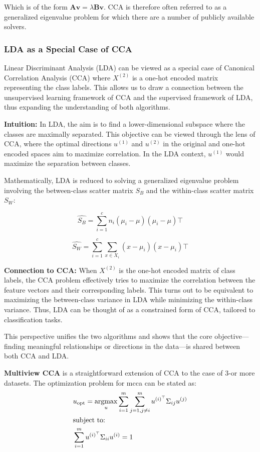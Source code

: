Which is of the form $\mathbf{A v} = \lambda \mathbf{B v}$. CCA is therefore often referred to as a generalized eigenvalue problem for which there are a number of publicly available solvers.

\subsubsection{LDA as a Special Case of CCA}

Linear Discriminant Analysis (LDA) can be viewed as a special case of Canonical Correlation Analysis (CCA) where \(X^{(2)}\) is a one-hot encoded matrix representing the class labels.
This allows us to draw a connection between the unsupervised learning framework of CCA and the supervised framework of LDA, thus expanding the understanding of both algorithms.

\textbf{Intuition:} In LDA, the aim is to find a lower-dimensional subspace where the classes are maximally separated. This objective can be viewed through the lens of CCA, where the optimal directions \(u^{(1)}\) and \(u^{(2)}\) in the original and one-hot encoded spaces aim to maximize correlation. In the LDA context, \(u^{(1)}\) would maximize the separation between classes.

Mathematically, LDA is reduced to solving a generalized eigenvalue problem involving the between-class scatter matrix \(S_B\) and the within-class scatter matrix \(S_W\):

\[
    \hat{S_B} = \sum_{i=1}^{c} n_i (\mu_i - \mu)(\mu_i - \mu)\top
\]

\[
    \hat{S_W} = \sum_{i=1}^{c} \sum_{x \in X_i} (x - \mu_i)(x - \mu_i)\top
\]

\textbf{Connection to CCA:} When \(X^{(2)}\) is the one-hot encoded matrix of class labels, the CCA problem effectively tries to maximize the correlation between the feature vectors and their corresponding labels.
This turns out to be equivalent to maximizing the between-class variance in LDA while minimizing the within-class variance.
Thus, LDA can be thought of as a constrained form of CCA, tailored to classification tasks.

This perspective unifies the two algorithms and shows that the core objective—finding meaningful relationships or directions in the data—is shared between both CCA and LDA.

\textbf{Multiview CCA} is a straightforward extension of CCA to the case of 3-or more datasets.
The optimization problem for \acrshort{mcca} can be stated as:
\begin{align}
     & u_{\text{opt}} = \underset{u}{\mathrm{argmax}} \sum_{i=1}^{m} \sum_{j=1, j \neq i}^{m} u^{(i)^{\top}} \Sigma_{ij} u^{(j)} \\
     & \text{subject to:} \notag \\
     & \sum_{i=1}^{m} u^{(i)^{\top}} \Sigma_{ii} u^{(i)} = 1 \notag
\end{align}

